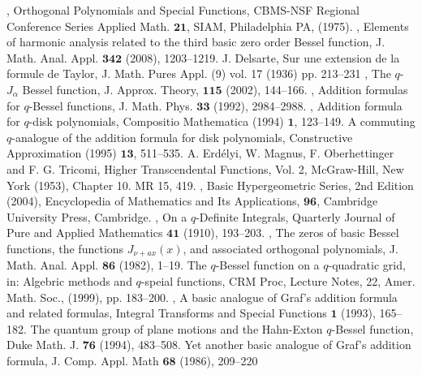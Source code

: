 \documentclass[12pt,a4paper]{amsart}
\numberwithin{equation}{section}
\theoremstyle{plain}
\theoremstyle{definition}
\theoremstyle{remark}
\numberwithin{equation}{section}
\numberwithin{table}{section}
\numberwithin{figure}{section}
\begin{document}
\begin{thebibliography}{99}
, {Orthogonal Polynomials and Special Functions}, {CBMS-NSF Regional Conference Series Applied Math. $\mathbf{21}$, SIAM, Philadelphia PA, (1975).}
, {Elements of harmonic analysis related to the third basic zero order Bessel function}, {J. Math. Anal. Appl.
$\mathbf{342}$ (2008), 1203--1219.}
 {J. Delsarte,} {Sur une extension de la formule de Taylor, J. Math. Pures Appl. (9) vol. 17 (1936) pp. 213--231}
, {The $q$-$J_{\alpha}$ Bessel function},
{J. Approx. Theory, $\mathbf{115}$ (2002), 144--166.}
, {Addition formulas for $q$-Bessel functions},
 {J. Math. Phys. $\mathbf{33}$ (1992), 2984--2988.}
, {Addition formula for $q$-disk
polynomials,} {Compositio Mathematica (1994) $\mathbf{1}$,
123--149.}
 {A commuting $q$-analogue of the addition
formula for disk polynomials,} {Constructive Approximation (1995)
$\mathbf{13}$, 511--535.}
 {A. Erd\'elyi, W. Magnus, F. Oberhettinger and F. G. Tricomi,} { Higher Transcendental Functions, Vol. 2, McGraw-Hill, New York (1953), Chapter 10. MR 15, 419.}
, {Basic Hypergeometric Series,
2nd Edition (2004), Encyclopedia of Mathematics and Its
Applications}, { $\mathbf{96}$, Cambridge University Press,
Cambridge.}
, {On a $q$-Definite Integrals},{ Quarterly
Journal of Pure and Applied Mathematics $\mathbf{41}$ (1910),
193--203.}
, {The zeros of basic Bessel functions, the functions
$J_{\nu+ ax}(x)$, and associated orthogonal polynomials}, {J. Math.
Anal. Appl. $\mathbf{86}$ (1982), 1--19.}
 {The $q$-Bessel function on a $q$-quadratic grid,} {in: Algebric methods and $q$-speial functions, CRM Proc, Lecture Notes, 22, Amer. Math. Soc., (1999), pp. 183--200.}
, {A basic analogue of Graf's addition formula and
related formulas}, {Integral Transforms and Special Functions
$\mathbf{1}$ (1993), 165--182.}
 {The quantum group of plane motions and the Hahn-Exton
$q$-Bessel function}, {Duke Math. J. $\mathbf{76}$ (1994),
483--508.}
 {Yet another basic analogue of Graf's addition formula},
{J. Comp. Appl. Math  $\mathbf{68}$ (1986), 209--220}

\end{thebibliography}
\end{document}
